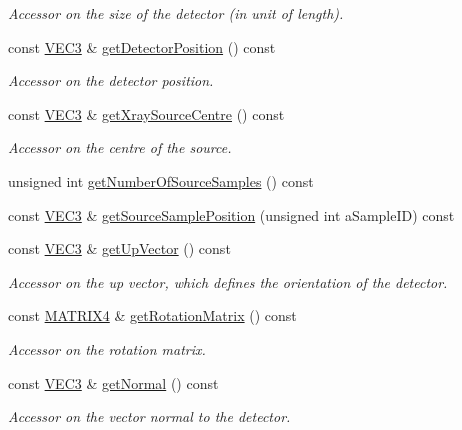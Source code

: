 \begin{DoxyCompactItemize}
\begin{DoxyCompactList}\small\item\em Accessor on the size of the detector (in unit of length). \end{DoxyCompactList}\item 
const \hyperlink{class_math_1_1_vec3}{VEC3} \& \hyperlink{classg_virtual_x_ray_1_1_x_ray_detector_a602b3799826827286d9fa9a155c4f33b}{getDetectorPosition} () const 
\begin{DoxyCompactList}\small\item\em Accessor on the detector position. \end{DoxyCompactList}\item 
const \hyperlink{class_math_1_1_vec3}{VEC3} \& \hyperlink{classg_virtual_x_ray_1_1_x_ray_detector_a04653d1dbe55f256889fe90207a46cf7}{getXraySourceCentre} () const 
\begin{DoxyCompactList}\small\item\em Accessor on the centre of the source. \end{DoxyCompactList}\item 
unsigned int \hyperlink{classg_virtual_x_ray_1_1_x_ray_detector_a518e95dda16004376bfdc624ff3495e0}{getNumberOfSourceSamples} () const 
\item 
const \hyperlink{class_math_1_1_vec3}{VEC3} \& \hyperlink{classg_virtual_x_ray_1_1_x_ray_detector_ae041d6539cd7b225dc224401d4d3a209}{getSourceSamplePosition} (unsigned int aSampleID) const 
\item 
const \hyperlink{class_math_1_1_vec3}{VEC3} \& \hyperlink{classg_virtual_x_ray_1_1_x_ray_detector_a355b93b5a269841c03aa4ef8c5786f92}{getUpVector} () const 
\begin{DoxyCompactList}\small\item\em Accessor on the up vector, which defines the orientation of the detector. \end{DoxyCompactList}\item 
const \hyperlink{class_math_1_1_matrix4x4}{MATRIX4} \& \hyperlink{classg_virtual_x_ray_1_1_x_ray_detector_aac6ab2cb0ea5c20211d0783bd6a8cfcc}{getRotationMatrix} () const 
\begin{DoxyCompactList}\small\item\em Accessor on the rotation matrix. \end{DoxyCompactList}\item 
const \hyperlink{class_math_1_1_vec3}{VEC3} \& \hyperlink{classg_virtual_x_ray_1_1_x_ray_detector_adfa24796ba538502309367546c0aca48}{getNormal} () const 
\begin{DoxyCompactList}\small\item\em Accessor on the vector normal to the detector. \end{DoxyCompactList}\item 

\end{DoxyCompactItemize}

